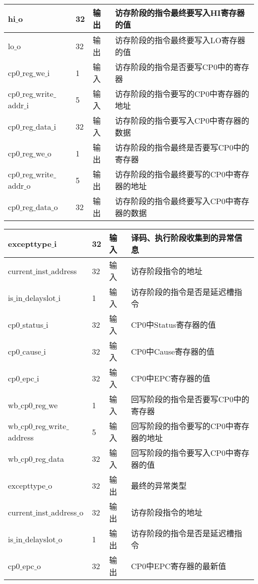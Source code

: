 \begin{table}[H]
\begin{tabular}{|l|l|l|l|}
		\hline
		hi$\_$o & 32 & 输出 & 访存阶段的指令最终要写入HI寄存器的值 \\
		\hline
		lo$\_$o & 32 & 输出 & 访存阶段的指令最终要写入LO寄存器的值 \\
		\hline
		cp0$\_$reg$\_$we$\_$i & 1 & 输入 & 访存阶段的指令是否要写CP0中的寄存器 \\
		\hline
		cp0$\_$reg$\_$write$\_$addr$\_$i & 5 & 输入 & 访存阶段的指令要写的CP0中寄存器的地址 \\
		\hline
		cp0$\_$reg$\_$data$\_$i & 32 & 输入 & 访存阶段的指令要写入CP0中寄存器的数据 \\
		\hline
		cp0$\_$reg$\_$we$\_$o & 1 & 输出 & 访存阶段的指令最终是否要写CP0中的寄存器 \\
		\hline
		cp0$\_$reg$\_$write$\_$addr$\_$o & 5 & 输出 & 访存阶段的指令最终要写的CP0中寄存器的地址 \\
		\hline
		cp0$\_$reg$\_$data$\_$o & 32 & 输出 & 访存阶段的指令最终要写入CP0中寄存器的数据 \\
		\hline
	\end{tabular}
\end{table}
\begin{table}[H]
	\centering
	\begin{tabular}{|l|l|l|l|}
		\hline
		excepttype$\_$i & 32 & 输入 & 译码、执行阶段收集到的异常信息 \\
		\hline
		current$\_$inst$\_$address & 32 & 输入 & 访存阶段指令的地址 \\
		\hline
		is$\_$in$\_$delayslot$\_$i & 1 & 输入 & 访存阶段的指令是否是延迟槽指令 \\
		\hline
		cp0$\_$status$\_$i & 32 & 输入 & CP0中Status寄存器的值 \\
		\hline
		cp0$\_$cause$\_$i & 32 & 输入 & CP0中Cause寄存器的值 \\
		\hline
		cp0$\_$epc$\_$i & 32 & 输入 & CP0中EPC寄存器的值 \\
		\hline
		wb$\_$cp0$\_$reg$\_$we & 1 & 输入 & 回写阶段的指令是否要写CP0中的寄存器 \\
		\hline
		wb$\_$cp0$\_$reg$\_$write$\_$address & 5 & 输入 & 回写阶段的指令要写的CP0中寄存器的地址 \\
		\hline
		wb$\_$cp0$\_$reg$\_$data & 32 & 输入 & 回写阶段的指令要写入CP0中寄存器的值 \\
		\hline
		excepttype$\_$o & 32 & 输出 & 最终的异常类型 \\
		\hline
		current$\_$inst$\_$address$\_$o & 32 & 输出 & 访存阶段指令的地址 \\
		\hline
		is$\_$in$\_$delayslot$\_$o & 1 & 输出 & 访存阶段的指令是否是延迟槽指令 \\
		\hline
		cp0$\_$epc$\_$o & 32 & 输出 & CP0中EPC寄存器的最新值 \\
		\hline
	\end{tabular}
\end{table}
